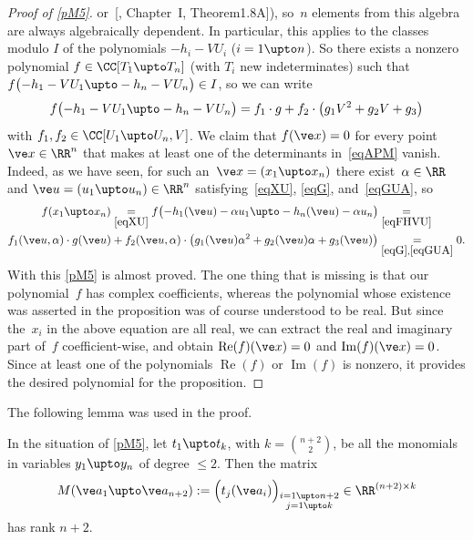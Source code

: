 \documentclass[reqno]{amsart}
\begin{document}
\begin{proof}[Proof of \cref{pM5}]
  or~[, Chapter~I, Theorem1.8A]), so~$n$ elements
  from this algebra are always algebraically dependent. In particular,
  this applies to the classes modulo $I$ of the polynomials
  $-h_i - V U_i$ ($i = 1 \upto n$). So there exists a nonzero
  polynomial $f \in \CC[T_1 \upto T_n]$ (with $T_i$ new
  indeterminates) such that
  $f\bigl(-h_1 - V U_1 \upto -h_n - V U_n\bigr) \in I$, so we can
  write
  \begin{equation} \label{eqFHVU}%
    f\bigl(-h_1 - V U_1 \upto -h_n - V U_n\bigr) = f_1 \cdot g + f_2
    \cdot \bigl(g_1 V^2 + g_2 V + g_3\bigr)
  \end{equation}
  with $f_1,f_2 \in \CC[U_1 \upto U_n,V]$. We claim that
  $f(\ve x) = 0$ for every point $\ve x \in \RR^n$ that makes at least
  one of the determinants in~\eqref{eqAPM} vanish. Indeed, as we have
  seen, for such an~$\ve x = (x_1 \upto x_n)$ there
  exist~$\alpha \in \RR$ and $\ve u = (u_1 \upto u_n) \in \RR^n$
  satisfying~\eqref{eqXU}, \eqref{eqG}, and~\eqref{eqGUA}, so
  \begin{multline*}
    f(x_1 \upto x_n) \underset{\eqref{eqXU}}{=} f\bigl(-h_1(\ve u) -
    \alpha u_1 \upto -h_n(\ve u) - \alpha u_n\bigr)
    \underset{\eqref{eqFHVU}}{=} \\
    f_1(\ve u,\alpha) \cdot g(\ve u) + f_2(\ve u,\alpha) \cdot
    \bigl(g_1(\ve u) \alpha^2 + g_2(\ve u) \alpha + g_3(\ve u)\bigr)
    \underset{\eqref{eqG}, \eqref{eqGUA}}{=} 0.
  \end{multline*}
  With this \cref{pM5} is almost proved. The one thing that is missing
  is that our polynomial~$f$ has complex coefficients, whereas the
  polynomial whose existence was asserted in the proposition was of
  course understood to be real. But since the~$x_i$ in the above
  equation are all real, we can extract the real and imaginary part
  of~$f$ coefficient-wise, and obtain
  $\operatorname{Re}(f)(\ve x) = 0$ and
  $\operatorname{Im}(f)(\ve x) = 0$. Since at least one of the
  polynomials $\operatorname{Re}(f)$ or $\operatorname{Im}(f)$ is
  nonzero, it provides the desired polynomial for the proposition.
\end{proof}

The following lemma was used in the proof.

\begin{lemma} \label{lM5}%
  In the situation of \cref{pM5}, let $t_1 \upto t_k$, with
  $k = \binom{n+2}{2}$, be all the monomials in variables $y_1 \upto y_n$
  of degree $\le 2$. Then the matrix
  \[
    M(\ve a_1 \upto \ve a_{n+2}) := \Bigl(t_j(\ve
      a_i)\Bigr)_{\substack{i = 1 \upto n+2 \\ j = 1 \upto k}} \in
    \RR^{(n+2) \times k}
  \]
  has rank $n + 2$.
\end{lemma}
\end{document}
